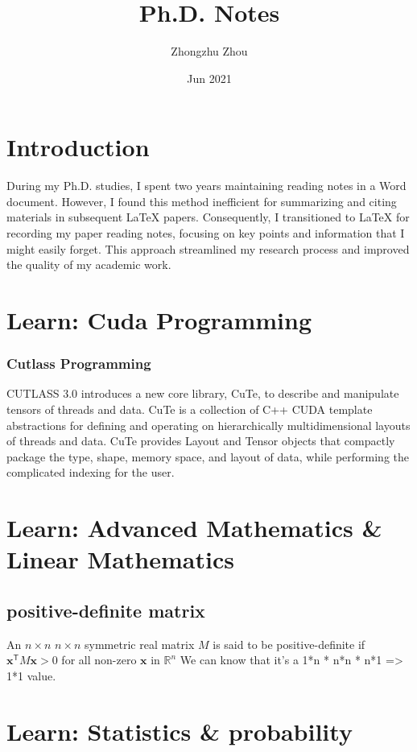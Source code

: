 \documentclass[8pt,UTF8]{article}
\title{Ph.D. Notes}
\author{Zhongzhu Zhou}
\date{Jun 2021}
\begin{document}
\newpage
\maketitle

\newpage
\tableofcontents

\newpage
\section{Introduction}
    During my Ph.D. studies, I spent two years maintaining reading notes in a Word document. However, I found this method inefficient for summarizing and citing materials in subsequent LaTeX papers. Consequently, I transitioned to LaTeX for recording my paper reading notes, focusing on key points and information that I might easily forget. This approach streamlined my research process and improved the quality of my academic work.

\section{Learn: Cuda Programming}\label{sec:cutlasslearning}
    \subsubsection{Cutlass Programming}
        CUTLASS 3.0 introduces a new core library, CuTe, to describe and manipulate tensors of threads and data. CuTe is a collection of C++ CUDA template abstractions for defining and operating on hierarchically multidimensional layouts of threads and data. CuTe provides Layout and Tensor objects that compactly package the type, shape, memory space, and layout of data, while performing the complicated indexing for the user.
        
\section{Learn: Advanced Mathematics \& Linear Mathematics}
    \subsection{positive-definite matrix}
        An $n \times n$ $n \times n$ symmetric real matrix $M$ is said to be positive-definite if $\mathbf{x}^\textsf{T} M \mathbf{x} >0 $ for all non-zero $\mathbf{x}$  in $\mathbb{R} ^{n}$
        We can know that it's a 1*n * n*n * n*1 => 1*1 value.

\section{Learn: Statistics \& probability}
\end{document}
